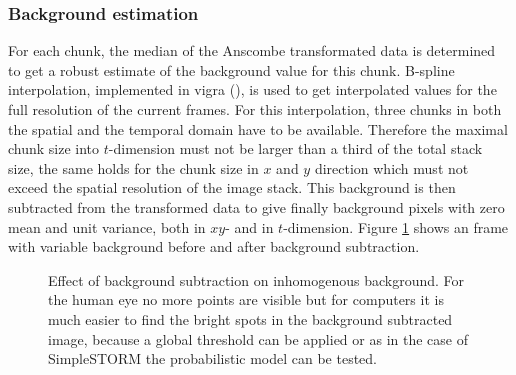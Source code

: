 \subsubsection{Background estimation}
For each chunk, the median of the Anscombe transformated data is determined to get a robust estimate of the background value for this chunk. 
B-spline interpolation, implemented in vigra (\cite{vigra}), is used to get interpolated values for the full resolution of the current frames. For this interpolation, three chunks in both the spatial and the temporal domain have to be available. Therefore the maximal chunk size into $t$-dimension must not be larger than a third of the total stack size, the same holds for the chunk size in $x$ and $y$ direction which must not exceed the spatial resolution of the image stack.\newline
This background is then subtracted from the transformed data to give finally background pixels with zero mean and unit variance, both in $xy$- and in $t$-dimension. Figure \ref{removedBG} shows an frame with variable background before and after background subtraction.
\begin{figure}
\hfill
{}
	\caption{Effect of background subtraction on inhomogenous background. For the human eye no more points are visible but for computers it is much easier to find the bright spots in the background subtracted image, because a global threshold can be applied or as in the case of SimpleSTORM the probabilistic model can be tested.}
	\label{removedBG}	
\end{figure}
